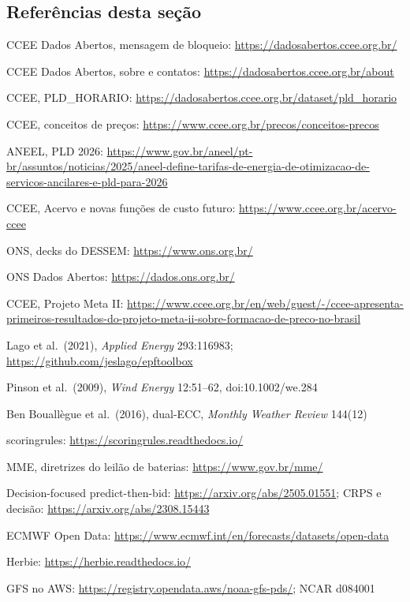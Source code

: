 \subsection*{Referências desta seção}
{\small
\begin{enumerate}[label={[\arabic*]},leftmargin=2.2em,itemsep=1pt]
\item CCEE Dados Abertos, mensagem de bloqueio: \url{https://dadosabertos.ccee.org.br/}
\item CCEE Dados Abertos, sobre e contatos: \url{https://dadosabertos.ccee.org.br/about}
\item CCEE, PLD\_HORARIO: \url{https://dadosabertos.ccee.org.br/dataset/pld_horario}
\item CCEE, conceitos de preços: \url{https://www.ccee.org.br/precos/conceitos-precos}
\item ANEEL, PLD 2026: \url{https://www.gov.br/aneel/pt-br/assuntos/noticias/2025/aneel-define-tarifas-de-energia-de-otimizacao-de-servicos-ancilares-e-pld-para-2026}
\item CCEE, Acervo e novas funções de custo futuro: \url{https://www.ccee.org.br/acervo-ccee}
\item ONS, decks do DESSEM: \url{https://www.ons.org.br/}
\item ONS Dados Abertos: \url{https://dados.ons.org.br/}
\item CCEE, Projeto Meta II: \url{https://www.ccee.org.br/en/web/guest/-/ccee-apresenta-primeiros-resultados-do-projeto-meta-ii-sobre-formacao-de-preco-no-brasil}
\item Lago et al.\ (2021), \emph{Applied Energy} 293:116983; \url{https://github.com/jeslago/epftoolbox}
\item Pinson et al.\ (2009), \emph{Wind Energy} 12:51--62, doi:10.1002/we.284
\item Ben Bouallègue et al.\ (2016), dual-ECC, \emph{Monthly Weather Review} 144(12)
\item scoringrules: \url{https://scoringrules.readthedocs.io/}
\item MME, diretrizes do leilão de baterias: \url{https://www.gov.br/mme/}
\item Decision-focused predict-then-bid: \url{https://arxiv.org/abs/2505.01551}; CRPS e decisão: \url{https://arxiv.org/abs/2308.15443}
\item ECMWF Open Data: \url{https://www.ecmwf.int/en/forecasts/datasets/open-data}
\item Herbie: \url{https://herbie.readthedocs.io/}
\item GFS no AWS: \url{https://registry.opendata.aws/noaa-gfs-pds/}; NCAR d084001

\end{enumerate}}
